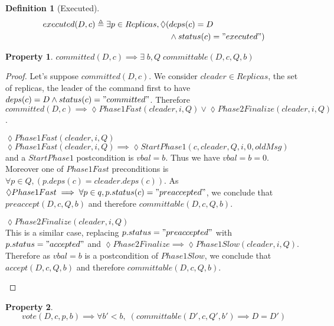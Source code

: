 \documentclass[a4paper]{article}
\theoremstyle{definition}
\newtheorem{definition}{Definition}
\theoremstyle{plain}
\newtheorem{property}{Property}
\begin{document}
\begin{definition}[Executed]
\begin{align*}
    executed(D,c) \triangleq  \exists p \in Replicas, \lozenge(& deps(c) = D \\
                                                                &\wedge status(c) = "executed") 
\end{align*}

\end{definition}





\begin{property}
$committed(D,c) \implies \exists \; b,Q  \; committable(D,c,Q,b)$
\end{property}

\begin{proof}
Let's suppose $committed(D,c)$. We consider $cleader \in Replicas$, the set of replicas, the leader of the command first to have $deps(c) = D \wedge status(c) = "committed"$. Therefore $committed(D,c) \implies \lozenge Phase1Fast(cleader,i,Q) \vee \lozenge Phase2Finalize(cleader,i,Q)$.

\begin{case}
    \item $\lozenge Phase1Fast(cleader,i,Q)$\\
    $\lozenge Phase1Fast(cleader,i,Q) \implies \lozenge StartPhase1(c,cleader,Q,i,0,oldMsg)$ and a $StartPhase1$ postcondition is $vbal=b$. Thus we have $vbal=b=0$. Moreover one of $Phase1Fast$ preconditions is $\forall p \in Q, (p.deps(c) = cleader.deps(c))$. As $\lozenge Phase1Fast \implies \forall p \in q, p.status(c) = "preaccepted"$, we conclude that $preaccept(D,c,Q,b)$ and therefore $committable(D,c,Q,b)$.
    
    \item $\lozenge Phase2Finalize(cleader,i,Q)$\\
    This is a similar case, replacing $p.status="preaccepted"$ with $p.status="accepted"$ and $\lozenge Phase2Finalize \implies \lozenge Phase1Slow(cleader,i,Q)$. Therefore as $vbal=b$ is a postcondition of $Phase1Slow$, we conclude that $accept(D,c,Q,b)$ and therefore $committable(D,c,Q,b)$.
\end{case}
\end{proof}

\begin{property}
\begin{equation*}
    vote(D,c,p,b) \implies \forall b'<b, \; (committable(D',c,Q',b') \implies D=D')
\end{equation*}
\end{property}
\end{document}
